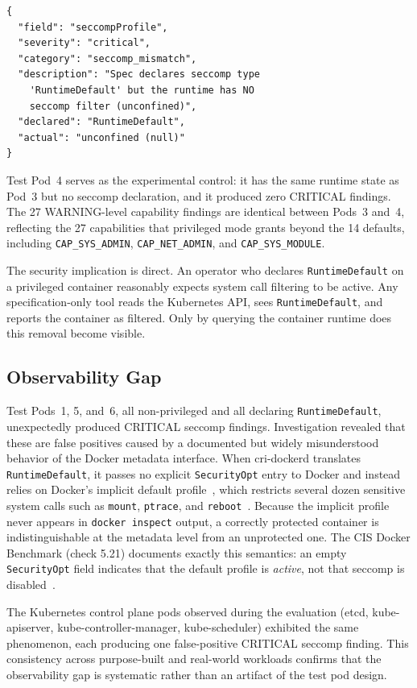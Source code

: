 \documentclass[sigconf]{acmart}
\begin{document}
\begin{lstlisting}
{
  "field": "seccompProfile",
  "severity": "critical",
  "category": "seccomp_mismatch",
  "description": "Spec declares seccomp type
    'RuntimeDefault' but the runtime has NO
    seccomp filter (unconfined)",
  "declared": "RuntimeDefault",
  "actual": "unconfined (null)"
}
\end{lstlisting}

Test Pod~4 serves as the experimental control: it has the same runtime state as Pod~3 but no seccomp declaration, and it produced zero CRITICAL findings. The 27 WARNING-level capability findings are identical between Pods~3 and~4, reflecting the 27 capabilities that privileged mode grants beyond the 14 defaults, including \texttt{CAP\_SYS\_ADMIN}, \texttt{CAP\_NET\_ADMIN}, and \texttt{CAP\_SYS\_MODULE}.

The security implication is direct. An operator who declares \texttt{RuntimeDefault} on a privileged container reasonably expects system call filtering to be active. Any specification-only tool reads the Kubernetes API, sees \texttt{RuntimeDefault}, and reports the container as filtered. Only by querying the container runtime does this removal become visible.

\subsection{Observability Gap}
\label{sec:obsgap}

Test Pods~1, 5, and~6, all non-privileged and all declaring \texttt{RuntimeDefault}, unexpectedly produced CRITICAL seccomp findings. Investigation revealed that these are false positives caused by a documented but widely misunderstood behavior of the Docker metadata interface. When cri-dockerd translates \texttt{RuntimeDefault}, it passes no explicit \texttt{SecurityOpt} entry to Docker and instead relies on Docker's implicit default profile~\cite{dockerseccomp2024}, which restricts several dozen sensitive system calls such as \texttt{mount}, \texttt{ptrace}, and \texttt{reboot}~\cite{datadog2023}. Because the implicit profile never appears in \texttt{docker inspect} output, a correctly protected container is indistinguishable at the metadata level from an unprotected one. The CIS Docker Benchmark (check 5.21) documents exactly this semantics: an empty \texttt{SecurityOpt} field indicates that the default profile is \emph{active}, not that seccomp is disabled~\cite{cisdocker2024, moric2025}.

The Kubernetes control plane pods observed during the evaluation (etcd, kube-apiserver, kube-controller-manager, kube-scheduler) exhibited the same phenomenon, each producing one false-positive CRITICAL seccomp finding. This consistency across purpose-built and real-world workloads confirms that the observability gap is systematic rather than an artifact of the test pod design.
\end{document}
